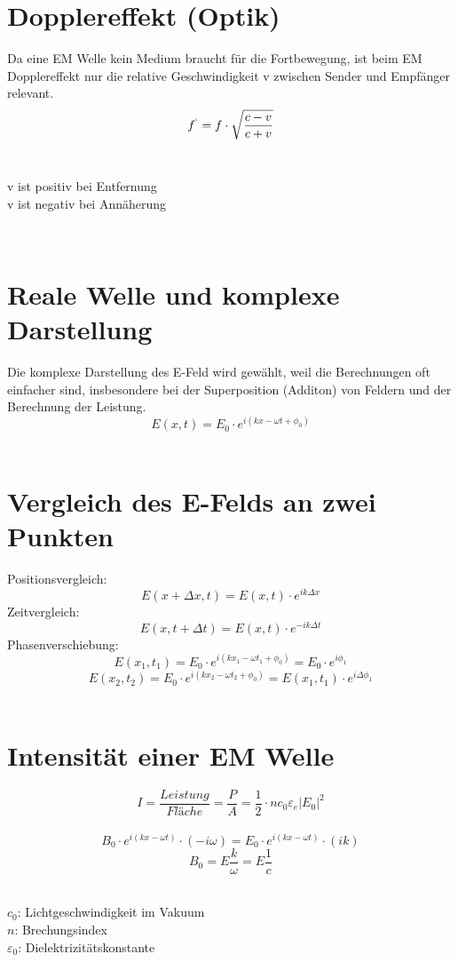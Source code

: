 \section{Dopplereffekt (Optik)}
Da eine EM Welle kein Medium braucht für die Fortbewegung, ist beim EM Dopplereffekt nur die relative Geschwindigkeit v zwischen Sender und Empfänger relevant.
\[
	f^`=f\cdot\sqrt{\frac{c-v}{c+v}}
\]
\\
\begin{footnotesize}
	v ist positiv bei Entfernung \\
	v ist negativ bei Annäherung \\
\end{footnotesize}
\\
\section{Reale Welle und komplexe Darstellung}	
Die komplexe Darstellung des E-Feld wird gewählt, weil die Berechnungen oft einfacher sind, insbesondere bei der Superposition (Additon) von Feldern und der Berechnung der Leistung.
\[
	E(x,t)=E_0\cdot e^{i(kx-\omega t +\phi_0)}
\]
\\
\section{Vergleich des E-Felds an zwei Punkten}
Positionsvergleich:
\[
	E(x+\Delta x,t)=E(x,t)\cdot e^{ik \Delta x}	
\]
Zeitvergleich:
\[
	E(x,t+\Delta t)=E(x,t)\cdot e^{-ik \Delta t} 
\]
Phasenverschiebung:
\[
	E(x_1,t_1)= E_0\cdot e^{i(kx_1-\omega t_1+\phi_0)}=E_0  \cdot e^{i\phi_1}
\]
\[
	E(x_2,t_2)= E_0\cdot e^{i(kx_2-\omega t_2+\phi_0)}=E(x_1,t_1)  \cdot e^{i\Delta \phi_1}
\]
\\
\section{Intensität einer EM Welle}
\[
	I=\frac{Leistung}{Fläche}=\frac{P}{A}=\frac{1}{2}\cdot nc_0\varepsilon_e |E_0|^2 
\]
\\
\[
	B_0\cdot e^{i(kx-\omega t)}\cdot (-i\omega) = 	
	E_0\cdot e^{i(kx-\omega t)}\cdot (ik)
\]
\[
	B_0=E \frac{k}{\omega}=E\frac{1}{c}
\]
\\
\begin{footnotesize}
	$c_0$:	Lichtgeschwindigkeit im Vakuum \\
	$n$:	Brechungsindex\\
	$\varepsilon_0$:	Dielektrizitätskonstante
\end{footnotesize}
\\
